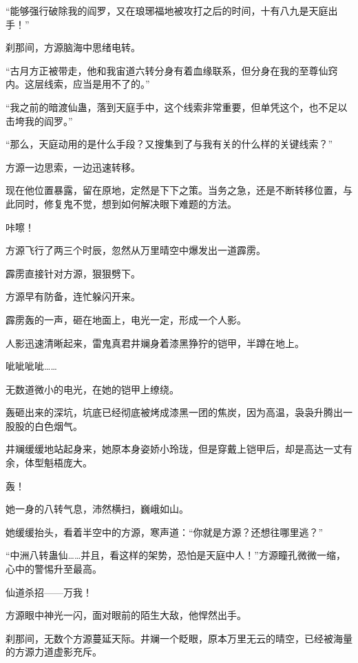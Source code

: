 
\begin{this_body}



“能够强行破除我的阎罗，又在琅琊福地被攻打之后的时间，十有八九是天庭出手！”

刹那间，方源脑海中思绪电转。

“古月方正被带走，他和我宙道六转分身有着血缘联系，但分身在我的至尊仙窍内。这层线索，应当是用不了的。”

“我之前的暗渡仙蛊，落到天庭手中，这个线索非常重要，但单凭这个，也不足以击垮我的阎罗。”

“那么，天庭动用的是什么手段？又搜集到了与我有关的什么样的关键线索？”

方源一边思索，一边迅速转移。

现在他位置暴露，留在原地，定然是下下之策。当务之急，还是不断转移位置，与此同时，修复鬼不觉，想到如何解决眼下难题的方法。

咔嚓！

方源飞行了两三个时辰，忽然从万里晴空中爆发出一道霹雳。

霹雳直接针对方源，狠狠劈下。

方源早有防备，连忙躲闪开来。

霹雳轰的一声，砸在地面上，电光一定，形成一个人影。

人影迅速清晰起来，雷鬼真君井斓身着漆黑狰狞的铠甲，半蹲在地上。

呲呲呲呲……

无数道微小的电光，在她的铠甲上缭绕。

轰砸出来的深坑，坑底已经彻底被烤成漆黑一团的焦炭，因为高温，袅袅升腾出一股股的白色烟气。

井斓缓缓地站起身来，她原本身姿娇小玲珑，但是穿戴上铠甲后，却是高达一丈有余，体型魁梧庞大。

轰！

她一身的八转气息，沛然横扫，巍峨如山。

她缓缓抬头，看着半空中的方源，寒声道：“你就是方源？还想往哪里逃？”

“中洲八转蛊仙……并且，看这样的架势，恐怕是天庭中人！”方源瞳孔微微一缩，心中的警惕升至最高。

仙道杀招——万我！

方源眼中神光一闪，面对眼前的陌生大敌，他悍然出手。

刹那间，无数个方源蔓延天际。井斓一个眨眼，原本万里无云的晴空，已经被海量的方源力道虚影充斥。


\end{this_body}
